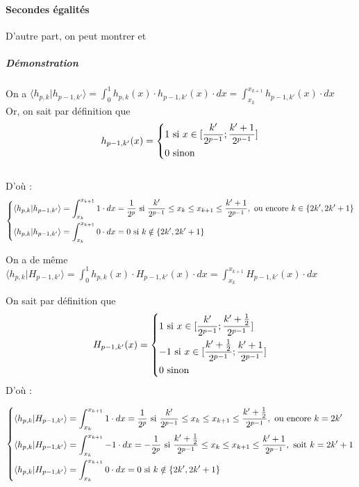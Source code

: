 \documentclass{article}
\begin{document}
\paragraph{Secondes égalités}

D'autre part, on peut montrer  et  \\


\subparagraph*{Démonstration} 

On a $\displaystyle \langle{}h_{p,k}|h_{p-1,k'}\rangle = \int_0^1 h_{p,k}(x)\cdot{}h_{p-1,k'}(x)\cdot{}dx = \int_{x_k}^{x_{k+1}}h_{p-1,k'}(x)\cdot{}dx$ \\

Or, on sait par définition que \[ h_{p-1,k'}(x)= \begin{dcases} 1 \text{ si }x \in [\frac{k'}{2^{p-1}};\frac{k'+1}{2^{p-1}} ] \\
0 \text{ sinon } \end{dcases} \]\\
D'où :
\[ \begin{dcases}
\langle{}h_{p,k}|h_{p-1,k'}\rangle = \int_{x_k}^{x_{k+1}}1\cdot{}dx
= \frac{1}{2^p} \text{ si } \frac{k'}{2^{p-1}} \leq x_k \leq x_{k+1} \leq \frac{k'+1}{2^{p-1}}, \text{ ou encore } k \in \{2k',2k'+1\}\\ 
\langle{}h_{p,k}|h_{p-1,k'}\rangle = \int_{x_k}^{x_{k+1}}0\cdot{}dx = 0 \text{ si } k \notin \{2k',2k'+1\}
\end{dcases} \]

On a de même \\
 $\displaystyle \langle{}h_{p,k}|H_{p-1,k'}\rangle = \int_0^{1}h_{p,k}(x)\cdot{}H_{p-1,k'}(x)\cdot{}dx = \int_{x_k}^{x_{k+1}}H_{p-1,k'}(x)\cdot{}dx$

On sait par définition que \[ H_{p-1,k'}(x) = \begin{dcases} 
1 \text{ si } x \in [\frac{k'}{2^{p-1}};\frac{k'+\frac{1}{2}}{2^{p-1}} ] \\
-1 \text{ si } x \in [\frac{k'+\frac{1}{2}}{2^{p-1}};\frac{k'+1}{2^{p-1}} ] \\
0 \text{ sinon }
\end{dcases}
\] D'où :

\[ \begin{dcases}
\langle{}h_{p,k}|H_{p-1,k'}\rangle = \int_{x_k}^{x_{k+1}}1\cdot{}dx = \frac{1}{2^p} \text{ si } \frac{k'}{2^{p-1}} \leq x_k \leq x_{k+1} \leq \frac{k'+\frac{1}{2}}{2^{p-1}}, \text{ ou encore } k = 2k' \\
\langle{}h_{p,k}|H_{p-1,k'}\rangle = \int_{x_k}^{x_{k+1}}-1\cdot{}dx = -\frac{1}{2^p} \text{ si } \frac{k'+\frac{1}{2}}{2^{p-1}} \leq x_k \leq x_{k+1} \leq \frac{k'+1}{2^{p-1}}, \text{ soit } k = 2k'+1 \\
\langle{}h_{p,k}|H_{p-1,k'}\rangle = \int_{x_k}^{x_{k+1}}0\cdot{}dx = 0 \text{ si } k \notin \{2k',2k'+1\}
\end{dcases}
\]
\end{document}
